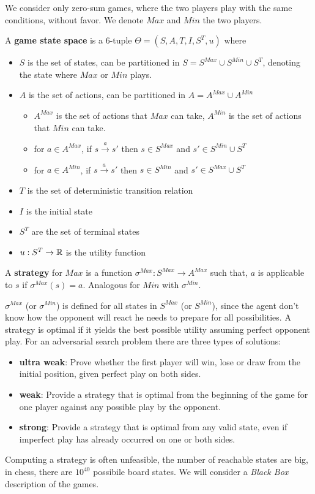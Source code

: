 \documentclass[10pt, letterpaper]{report}
\begin{document}
We consider only zero-sum games, where the two players play with the same conditions, without favor. We denote $Max$ and $Min$ the two players.\begin{definition}
    A \textbf{game state space} is a 6-tuple $\Theta=(S,A,T,I,S^T,u)$ where\end{definition}\begin{itemize}
        \item $S$ is the set of states, can be partitioned in $S=S^{Max}\cup S^{Min}\cup S^T$, denoting the state where $Max$ or $Min$ plays.
        \item $A$ is the set of actions, can be partitioned in $A=A^{Max}\cup A^{Min}$\begin{itemize}
        \item $A^{Max}$ is the set of actions that $Max$ can take, $A^{Min}$ is the set of actions that $Min$ can take. 
            \item for $a\in A^{Max}$, if $s\xrightarrow{a} s'$ then $s\in S^{Max}$ and $s'\in S^{Min}\cup S^T$
            \item for $a\in A^{Min}$, if $s\xrightarrow{a} s'$ then $s\in S^{Min}$ and $s'\in S^{Max}\cup S^T$
        \end{itemize}
        \item $T$ is the set of deterministic transition relation
        \item $I$ is the initial state 
        \item $S^T$ are the set of terminal states
        \item $u:S^T\rightarrow{\mathbb R}$ is the utility function
    \end{itemize}
\begin{definition}
    A \textbf{strategy} for $Max$ is a function $\sigma^{Max}:S^{Max}\rightarrow A^{Max}$ such that, $a$ is applicable to $s$ if $\sigma^{Max}(s)=a$. Analogous for $Min$ with $\sigma^{Min}$.
\end{definition}
$\sigma^{Max}$ (or $\sigma^{Min}$) is defined for all states in $S^{Max}$ (or $S^{Min}$), since the agent don't know how the opponent will react he needs to prepare for all
possibilities. A strategy is optimal if it yields the best possible utility assuming
perfect opponent play. For an adversarial search problem there are three types of solutions:\begin{itemize}
    \item \textbf{ultra weak}: Prove whether the first player will win, lose or draw from the
initial position, given perfect play on both sides.
\item \textbf{weak}: Provide a strategy that is optimal from the beginning of the game
for one player against any possible play by the opponent.
\item\textbf{strong}: Provide a strategy that is optimal from any valid state, even if
imperfect play has already occurred on one or both sides.
\end{itemize}
Computing a strategy is often unfeasible, the number of reachable states are big, in chess, there are $10^{40}$ possibile board states. We will consider a \textit{Black Box} description of the games.
\end{document}
